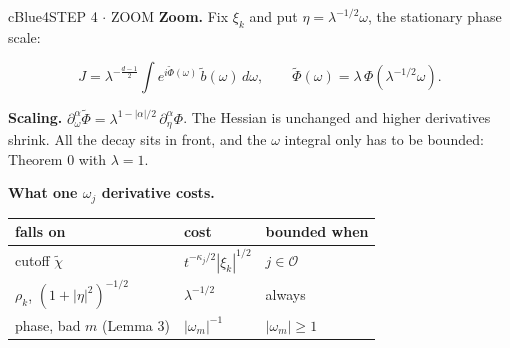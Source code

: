 \documentclass[10pt]{article}
\newcommand{\cO}{\mathcal{O}}
\newcommand{\lab}[2]{\textbf{\color{#1}#2}}
\begin{document}
\begin{minipage}[t][49.0cm][t]{0.322\textwidth}\vspace{0pt}

\begin{panel}{cBlue}{4}{STEP 4 $\cdot$ ZOOM}
\lab{cBlue}{Zoom.} Fix $\xi_k$ and put $\eta=\lambda^{-1/2}\omega$, the stationary phase scale:
\begin{keybox}[cBlue]
\[
J=\lambda^{-\frac{d-1}{2}}\int e^{i\tilde\Phi(\omega)}\,\tilde b(\omega)\,d\omega,\qquad
\tilde\Phi(\omega)=\lambda\,\Phi(\lambda^{-1/2}\omega).
\]
\end{keybox}
\lab{cBlue}{Scaling.} $\partial_\omega^\alpha\tilde\Phi=\lambda^{1-|\alpha|/2}\,\partial_\eta^\alpha\Phi$.
The Hessian is unchanged and higher derivatives shrink. All the decay sits in front, and the
$\omega$ integral only has to be bounded: Theorem 0 with $\lambda=1$.

\begin{center}
\end{center}

\lab{cBlue}{What one $\omega_j$ derivative costs.}

{\small
\begin{tabular}{@{}p{3.6cm}p{3.5cm}l@{}}
\textbf{falls on} & \textbf{cost} & \textbf{bounded when}\\\hline
cutoff $\tilde\chi$ & $t^{-\kappa_j/2}|\xi_k|^{1/2}$ & $j\in\cO$\\
$\rho_k$, $(1+|\eta|^2)^{-1/2}$ & $\lambda^{-1/2}$ & always\\
phase, bad $m$ (Lemma 3) & $|\omega_m|^{-1}$ & $|\omega_m|\ge1$\\
\end{tabular}}


\end{panel}
\end{minipage}
\end{document}
